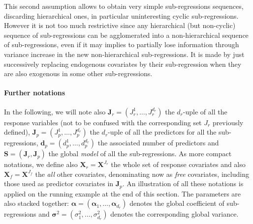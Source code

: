 \documentclass[12pt,a4paper]{report}
\begin{document}
 This second assumption allows to obtain very simple sub-regressions sequences, discarding hierarchical ones, in particular uninteresting cyclic sub-regressions. However it is not too much restrictive since any hierarchical (but non-cyclic) sequence of sub-regressions can be agglomerated into a non-hierarchical sequence of sub-regressions, even if it may implies to partially lose information through variance increase in the new non-hierarchical sub-regressions. It is made by just successively replacing endogenous covariates by their sub-regression when they are also exogenous in some other sub-regressions. 

\paragraph{Further notations} In the following, we will note also $\boldsymbol{J}_r=(J_{r}^1,\ldots,J_r^{d_r})$ the $d_r$-uple of all the response variables (not to be confused with the corresponding set $J_r$ previously defined), $\boldsymbol{J}_p=(J_{p}^1,\ldots,J_p^{d_r})$ the $d_r$-uple of all the predictors for all the sub-regressions, $\boldsymbol{d}_p=(d_p^1,\ldots,d_p^{d_{r}})$ the associated number of predictors and $\boldsymbol{S}=(\boldsymbol{J}_r,\boldsymbol{J}_p)$ the global {\it model} of all the sub-regressions. As more compact notations, we define also $\boldsymbol{X}_r=\boldsymbol{X}^{J_{r}}$ the whole set of response covariates and also $\boldsymbol{X}_f=\boldsymbol{X}^{J_{f}}$ the {\it all} other covariates, denominating now as {\it free} covariates, including those used as predictor covariates in $\boldsymbol{J}_p$. An illustration of all these notations is applied on the running example at the end of this section. The parameters are also stacked together: $\boldsymbol{\alpha}=(\boldsymbol{\alpha}_1,\ldots,\boldsymbol{\alpha}_{d_r})$ denotes the global coefficient of sub-regressions and $\boldsymbol{\sigma}^2=(\sigma^2_1,\ldots,\sigma^2_{d_r})$ denotes the corresponding global variance.
\end{document}
